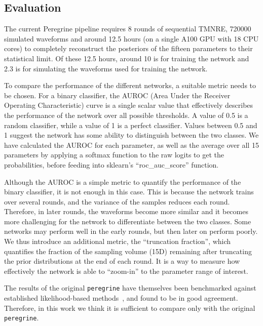 \subsection{Evaluation}

The current Peregrine pipeline requires 8 rounds of sequential TMNRE, 720000 simulated waveforms and around 12.5 hours (on a single A100 GPU with 18 CPU cores) to completely reconstruct the posteriors of the fifteen parameters to their statistical limit. Of these 12.5 hours, around 10 is for training the network and 2.3 is for simulating the waveforms used for training the network. 

To compare the performance of the different networks, a suitable metric needs to be chosen. For a binary classifier, the AUROC (Area Under the Receiver Operating Characteristic) curve is a single scalar value that effectively describes the performance of the network over all possible thresholds. A value of 0.5 is a random classifier, while a value of 1 is a perfect classifier. Values between 0.5 and 1 suggest the network has some ability to distinguish between the two classes. We have calculated the AUROC for each parameter, as well as the average over all 15 parameters by applying a softmax function to the raw logits to get the probabilities, before feeding into sklearn's \enquote{roc\_auc\_score} function.

Although the AUROC is a simple metric to quantify the performance of the binary classifier, it is not enough in this case. This is because the network trains over several rounds, and the variance of the samples reduces each round. Therefore, in later rounds,  the waveforms become more similar and it becomes more challenging for the network to differentiate between the two classes. Some networks may perform well in the early rounds, but then later on perform poorly. We thus introduce an additional metric, the \enquote{truncation fraction}, which quantifies the fraction of the sampling volume (15D) remaining after truncating the prior distributions at the end of each round. It is a way to measure how effectively the network is able to \enquote{zoom-in} to the parameter range of interest.

The results of the original \texttt{peregrine} have themselves been benchmarked against established likelihood-based methods~\cite{Speagle_2020}, and found to be in good agreement. Therefore, in this work we think it is sufficient to compare only with the original \texttt{peregrine}.

